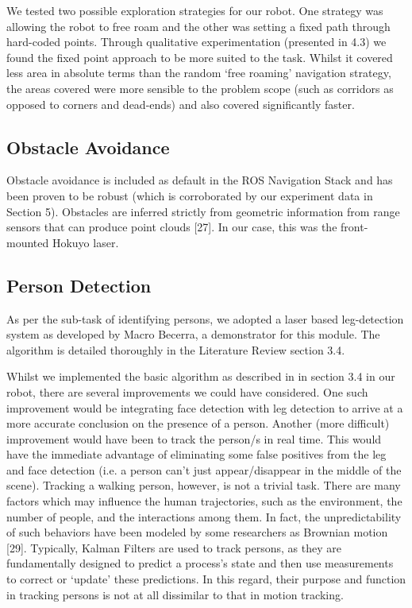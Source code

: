 \documentclass{article}
\begin{document}
We tested two possible exploration strategies for our robot. One strategy was allowing the robot to free roam and the other was setting a fixed path through hard-coded points. Through qualitative experimentation (presented in 4.3) we found the fixed point approach to be more suited to the task. Whilst it covered less area in absolute terms than the random ‘free roaming’ navigation strategy, the areas covered were more sensible to the problem scope (such as corridors as opposed to corners and dead-ends) and also covered significantly faster.

	\subsection{Obstacle Avoidance}
	Obstacle avoidance is included as default in the ROS Navigation Stack and has been proven to be robust (which is corroborated by our experiment data in Section 5). Obstacles are inferred strictly from geometric information from range sensors that can produce point clouds [27]. In our case, this was the front-mounted Hokuyo laser. 

	\subsection{Person Detection}
	As per the sub-task of identifying persons, we adopted a laser based leg-detection system as developed by Macro Becerra, a demonstrator for this module. The algorithm is detailed thoroughly in the Literature Review section 3.4.

Whilst we implemented the basic algorithm as described in in section 3.4 in our robot, there are several improvements we could have considered. One such improvement would be integrating face detection with leg detection to arrive at a more accurate conclusion on the presence of a person. Another (more difficult) improvement would have been to track the person/s in real time. This would have the immediate advantage of eliminating some false positives from the leg and face detection (i.e. a person can't just appear/disappear in the middle of the scene). Tracking a walking person, however, is not a trivial task. There are many factors which may influence the human trajectories, such as the environment, the number of people, and the interactions among them. In fact, the unpredictability of such behaviors have been modeled by some researchers as Brownian motion [29]. Typically, Kalman Filters are used to track persons, as they are fundamentally designed to predict a process’s state and then use measurements to correct or ‘update’ these predictions. In this regard, their purpose and function in tracking persons is not at all dissimilar to that in motion tracking.
\end{document}

